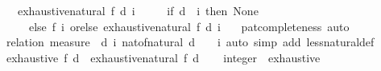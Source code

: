 \begin{isabellebody}
\ \ \ {\isachardoublequoteopen}exhaustive{\isacharunderscore}{\kern0pt}natural{\isacharprime}{\kern0pt}\ f\ d\ i\ {\isacharequal}{\kern0pt}\isanewline
\ \ \ \ {\isacharparenleft}{\kern0pt}if\ d\ {\isacharless}{\kern0pt}\ i\ then\ None\isanewline
\ \ \ \ \ else\ {\isacharparenleft}{\kern0pt}f\ i\ orelse\ exhaustive{\isacharunderscore}{\kern0pt}natural{\isacharprime}{\kern0pt}\ f\ d\ {\isacharparenleft}{\kern0pt}i\ {\isacharplus}{\kern0pt}\ {}{\isacharparenright}{\kern0pt}{\isacharparenright}{\kern0pt}{\isacharparenright}{\kern0pt}{\isachardoublequoteclose}\isanewline
%
\isadelimproof
%
\endisadelimproof
%
\isatagproof
{}\isamarkupfalse%
\ pat{\isacharunderscore}{\kern0pt}completeness\ auto%
\endisatagproof
{\isafoldproof}%
%
\isadelimproof
\isanewline
%
\endisadelimproof
\isanewline
{}\isamarkupfalse%
\isanewline
%
\isadelimproof
\ \ %
\endisadelimproof
%
\isatagproof
{}\isamarkupfalse%
\ {\isacharparenleft}{\kern0pt}relation\ {\isachardoublequoteopen}measure\ {\isacharparenleft}{\kern0pt}{\isasymlambda}{\isacharparenleft}{\kern0pt}{\isacharunderscore}{\kern0pt}{\isacharcomma}{\kern0pt}\ d{\isacharcomma}{\kern0pt}\ i{\isacharparenright}{\kern0pt}{\isachardot}{\kern0pt}\ nat{\isacharunderscore}{\kern0pt}of{\isacharunderscore}{\kern0pt}natural\ {\isacharparenleft}{\kern0pt}d\ {\isacharplus}{\kern0pt}\ {}\ {\isacharminus}{\kern0pt}\ i{\isacharparenright}{\kern0pt}{\isacharparenright}{\kern0pt}{\isachardoublequoteclose}{\isacharparenright}{\kern0pt}\ {\isacharparenleft}{\kern0pt}auto\ simp\ add{\isacharcolon}{\kern0pt}\ less{\isacharunderscore}{\kern0pt}natural{\isacharunderscore}{\kern0pt}def{\isacharparenright}{\kern0pt}%
\endisatagproof
{\isafoldproof}%
%
\isadelimproof
\isanewline
%
\endisadelimproof
\isanewline
{}\isamarkupfalse%
\ {\isachardoublequoteopen}exhaustive\ f\ d\ {\isacharequal}{\kern0pt}\ exhaustive{\isacharunderscore}{\kern0pt}natural{\isacharprime}{\kern0pt}\ f\ d\ {}{\isachardoublequoteclose}\isanewline
\isanewline
{}\isamarkupfalse%
%
\isadelimproof
\ %
\endisadelimproof
%
\isatagproof
\isacommand{{\isachardot}{\kern0pt}{\isachardot}{\kern0pt}}\isamarkupfalse%
%
\endisatagproof
{\isafoldproof}%
%
\isadelimproof
%
\endisadelimproof
\isanewline
\isanewline
{}\isamarkupfalse%
\isanewline
\isanewline
{}\isamarkupfalse%
\ integer\ {\isacharcolon}{\kern0pt}{\isacharcolon}{\kern0pt}\ exhaustive\isanewline
{}\isanewline
\isanewline
{}\isamarkupfalse%

\end{isabellebody}
